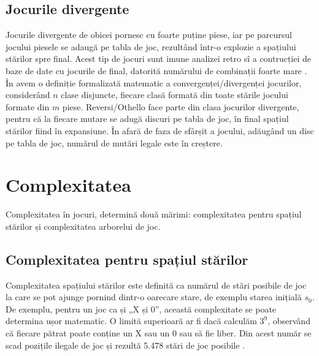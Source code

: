 \documentclass[12pt,twoside,a4paper,fleqn]{book}
\theoremstyle{definition}
\begin{document}
\subsection{Jocurile divergente}
Jocurile divergente de obicei pornesc cu foarte puține piese, iar pe parcursul jocului piesele se adaugă pe tabla de joc, rezultând într-o explozie a spațiului stărilor spre final. Acest tip de jocuri sunt imune analizei retro sî a contrucției de baze de date cu jocurile de final, datorită numărului de combinații foarte mare \cite{games_solved_herik}. În \cite{allis} avem o definiție formalizată matematic a convergenței/divergenței jocurilor, considerând $n$ clase disjuncte, fiecare clasă formată din toate stările jocului formate din $m$ piese. Reversi/Othello face parte din clasa jocurilor divergente, pentru că la fiecare mutare se adugă discuri pe tabla de joc, în final spațiul stărilor fiind în expansiune. În afară de faza de sfârșit a jocului, adăugând un disc pe tabla de joc, numărul de mutări legale este în creștere.

\section{Complexitatea}
\label{capitol_complexitate}
Complexitatea în jocuri, determină două mărimi: complexitatea pentru spațiul stărilor și complexitatea arborelui de joc.
\subsection{Complexitatea pentru spațiul stărilor}
Complexitatea spațiului stărilor este definită ca numărul de stări posibile de joc la care se pot ajunge pornind dintr-o oarecare stare, de exemplu starea inițială $s_{0}$. De exemplu, pentru un joc ca și „X și 0”, această complexitate se poate determina ușor matematic. O limită superioară ar fi dacă calculăm $3^{9}$, observând că fiecare pătrat poate conține un X sau un 0 sau să fie liber. Din acest număr se scad pozițile ilegale de joc și rezultă 5.478 stări de joc posibile \cite{allis}.
\end{document}
